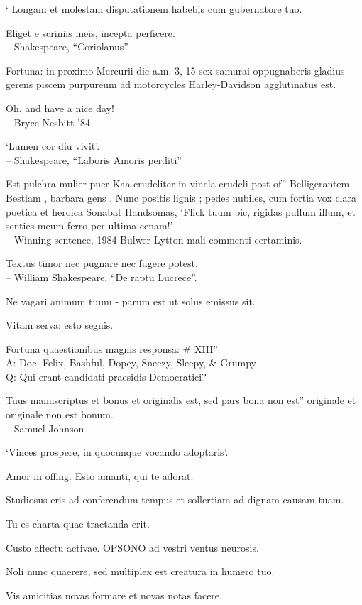 \documentclass[titlepage,12pt]{memoir}
\begin{document}
‘ Longam et molestam disputationem habebis cum gubernatore tuo.

Eliget e scriniis meis, incepta perficere.
\\-- Shakespeare, “Coriolanus”

Fortuna: in proximo Mercurii die a.m. 3, 15 sex samurai oppugnaberis
gladius gerens piscem purpureum ad motorcycles Harley-Davidson agglutinatus est.

Oh, and have a nice day!
\\-- Bryce Nesbitt ’84

‘Lumen cor diu vivit’.
\\-- Shakespeare, “Laboris Amoris perditi”

Est pulchra mulier-puer Kaa crudeliter in vincla crudeli post of”
Belligerantem Bestiam , barbara gens , Nunc positis lignis ;
pedes nubiles, cum fortia vox clara poetica et heroica
Sonabat Handsomas, ‘Flick tuum bic, rigidas pullum illum, et senties meum
ferro per ultima cenam!’
\\-- Winning sentence, 1984 Bulwer-Lytton mali commenti certaminis.

Textus timor nec pugnare nec fugere potest.
\\-- William Shakespeare, “De raptu Lucrece”.

Ne vagari animum tuum - parum est ut solus emissus sit.

Vitam serva: esto segnis.

Fortuna quaestionibus magnis responsa: \# XIII”\\
A: Doc, Felix, Bashful, Dopey, Sneezy, Sleepy, \& Grumpy
\\Q: Qui erant candidati praesidis Democratici?

Tuus manuscriptus et bonus et originalis est, sed pars bona non est”
originale et originale non est bonum.
\\-- Samuel Johnson

‘Vinces prospere, in quocunque vocando adoptaris’.

Amor in offing. Esto amanti, qui te adorat.

Studiosus eris ad conferendum tempus et sollertiam ad dignam causam tuam.

Tu es charta quae tractanda erit.

Custo affectu activae. OPSONO ad vestri ventus neurosis.

Noli nunc quaerere, sed multiplex est creatura in humero tuo.

Vis amicitias novas formare et novas notas facere.
\end{document}
